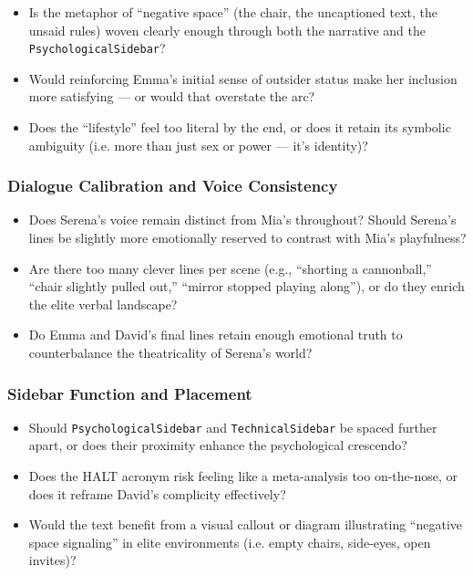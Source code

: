 \begin{itemize}
  \item Is the metaphor of “negative space” (the chair, the uncaptioned text, the unsaid rules) woven clearly enough through both the narrative and the \texttt{PsychologicalSidebar}?
  \item Would reinforcing Emma’s initial sense of outsider status make her inclusion more satisfying — or would that overstate the arc?
  \item Does the ``lifestyle'' feel too literal by the end, or does it retain its symbolic ambiguity (i.e. more than just sex or power — it’s identity)?
\end{itemize}

\subsubsection*{Dialogue Calibration and Voice Consistency}

\begin{itemize}
  \item Does Serena’s voice remain distinct from Mia’s throughout? Should Serena’s lines be slightly more emotionally reserved to contrast with Mia’s playfulness?
  \item Are there too many clever lines per scene (e.g., ``shorting a cannonball,'' ``chair slightly pulled out,'' ``mirror stopped playing along''), or do they enrich the elite verbal landscape?
  \item Do Emma and David’s final lines retain enough emotional truth to counterbalance the theatricality of Serena’s world?
\end{itemize}

\subsubsection*{Sidebar Function and Placement}

\begin{itemize}
  \item Should \texttt{PsychologicalSidebar} and \texttt{TechnicalSidebar} be spaced further apart, or does their proximity enhance the psychological crescendo?
  \item Does the HALT acronym risk feeling like a meta-analysis too on-the-nose, or does it reframe David’s complicity effectively?
  \item Would the text benefit from a visual callout or diagram illustrating “negative space signaling” in elite environments (i.e. empty chairs, side-eyes, open invites)?
\end{itemize}
